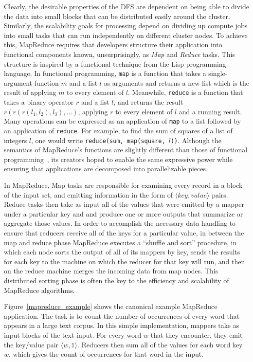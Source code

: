 Clearly, the desirable properties of the DFS are dependent on being able to divide the data into small blocks that can be distributed easily around the cluster. Similarly, the scalability goals for processing depend on dividing up compute jobs into small tasks that can run independently on different cluster nodes. To achieve this, MapReduce requires that developers structure their application into functional components known, unsurprisingly, as \emph{Map} and \emph{Reduce} tasks. This structure is inspired by a functional technique from the Lisp programming language. In functional programming, \texttt{map} is a function that takes a single-argument function $m$ and a list $l$ as arguments and returns a new list which is the result of applying $m$ to every element of $l$. Meanwhile, \texttt{reduce} is a function that takes a binary operator $r$ and a list $l$, and returns the result $r(r(r(l_1,l_2),l_3),...)$, applying $r$ to every element of $l$ and a running result. Many operations can be expressed as an application of \texttt{map} to a list followed by an application of \texttt{reduce}. For example, to find the sum of squares of a list of integers $l$, one would write \texttt{reduce(sum, map(square, $l$))}. Although the semantics of MapReduce's functions are slightly different than those of functional programming~\cite{lammel20081}, its creators hoped to enable the same expressive power while ensuring that applications are decomposed into parallelizable pieces.

In MapReduce, Map tasks are responsible for examining every record in a block of the input set, and emitting information in the form of $\langle key, value \rangle$ pairs. Reduce tasks then take as input all of the values that were emitted by a mapper under a particular key and and produce one or more outputs that summarize or aggregate those values. In order to accomplish the necessary data handling to ensure that reducers receive all of the keys for a particular value, in between the map and reduce phase MapReduce executes a ``shuffle and sort'' procedure, in which each node sorts the output of all of its mappers by key, sends the results for each key to the machine on which the reducer for that key will run, and then on the reduce machine merges the incoming data from map nodes. This distributed sorting phase is often the key to the efficiency and scalability of MapReduce algorithms.

Figure~\ref{mapreduce_example} shows the canonical example MapReduce application. The task is to count the number of occurrences of every word that appears in a large text corpus. In this simple implementation, mappers take as input blocks of the text input. For every word $w$ that they encounter, they emit the key/value pair $\langle w, 1 \rangle$. Reducers then sum all of the values for each word key $w$, which gives the count of occurrences for that word in the input.

